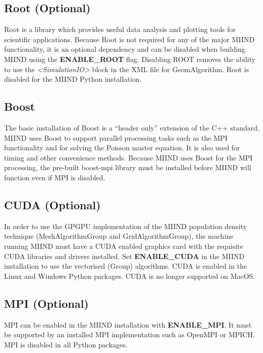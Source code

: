 \documentclass[utf8]{frontiers_suppmat} %
\begin{document}
\subsection*{Root (Optional)}
Root \citep{brun1997root} is a library which provides useful data analysis and plotting tools for scientific applications. Because Root is not required for any of the major MIIND functionality, it is an optional dependency and can be disabled when building MIIND using the \textbf{ENABLE\_ROOT} flag. Disabling ROOT removes the ability to use the \textit{\textless SimulationIO\textgreater} block in the XML file for GeomAlgorithm. Root is disabled for the MIIND Python installation. \\

\subsection*{Boost}
The basic installation of Boost is a ``header only'' extension of the C++ standard. MIIND uses Boost to support parallel processing tasks such as the MPI functionality and for solving the Poisson master equation. It is also used for timing and other convenience methods. Because MIIND uses Boost for the MPI processing, the pre-built boost-mpi library must be installed before MIIND will function even if MPI is disabled. \\

\subsection*{CUDA (Optional)}
In order to use the GPGPU implementation of the MIIND population density technique (MeshAlgorithmGroup and GridAlgorithmGroup), the machine running MIIND must have a CUDA enabled graphics card with the requisite CUDA libraries and drivers installed. Set \textbf{ENABLE\_CUDA} in the MIIND installation to use the vectorised (Group) algorithms. CUDA is enabled in the Linux and Windows Python packages. CUDA is no longer supported on MacOS.\\

\subsection*{MPI (Optional)}
MPI can be enabled in the MIIND installation with \textbf{ENABLE\_MPI}. It must be supported by an installed MPI implementation such as OpenMPI or MPICH. MPI is disabled in all Python packages.\\
\end{document}
